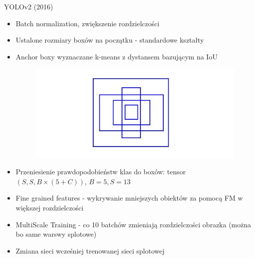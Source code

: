 \documentclass[11pt]{beamer}
\begin{document}
\begin{frame}{YOLOv2 (2016)}
\begin{itemize}
    \item Batch normalization, zwiększenie rozdzielczości
    \item Ustalone rozmiary boxów na początku - standardowe kształty
    \item Anchor boxy wyznaczane k-means z dystansem bazującym na IoU
    \begin{figure}[H]
        \centering
        \includegraphics[height=0.15\textheight]{grafika/boxy.jpeg}
    \end{figure}
    \item Przeniesienie prawdopodobieństw klas do boxów: tensor $(S,S, B\times(5+C)) $, $B=5, S=13$
    \item Fine grained features - wykrywanie mniejszych obiektów za pomocą FM w większej rozdzielczości
    \item MultiScale Training - co 10 batchów zmieniają rozdzielczości obrazka (można bo same warswy splotowe)
    \item Zmiana sieci wcześniej trenowanej sieci splotowej
\end{itemize}
\end{frame}
\end{document}
